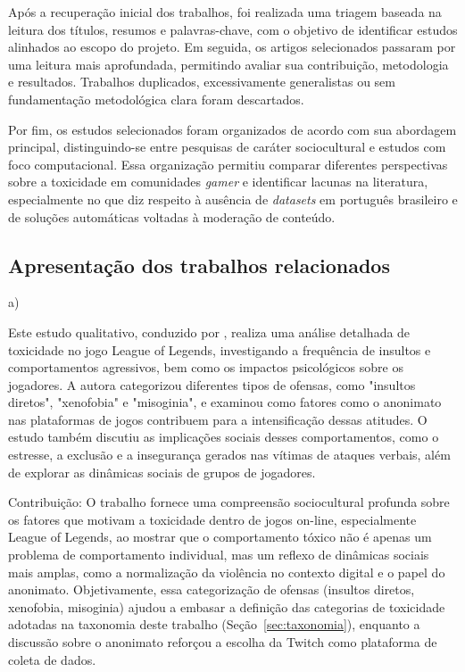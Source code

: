 \documentclass{eic-bcc-tcc}
\begin{document}
Após a recuperação inicial dos trabalhos, foi realizada uma triagem baseada na leitura dos títulos, resumos e palavras-chave, com o objetivo de identificar estudos alinhados ao escopo do projeto. Em seguida, os artigos selecionados passaram por uma leitura mais aprofundada, permitindo avaliar sua contribuição, metodologia e resultados. Trabalhos duplicados, excessivamente generalistas ou sem fundamentação metodológica clara foram descartados.

Por fim, os estudos selecionados foram organizados de acordo com sua abordagem principal, distinguindo-se entre pesquisas de caráter sociocultural e estudos com foco computacional. Essa organização permitiu comparar diferentes perspectivas sobre a toxicidade em comunidades \textit{gamer} e identificar lacunas na literatura, especialmente no que diz respeito à ausência de \textit{datasets} em português brasileiro e de soluções automáticas voltadas à moderação de conteúdo.

\subsection{Apresentação dos trabalhos relacionados}

a) \cite{assali2024comportamento}

Este estudo qualitativo, conduzido por \cite{assali2024comportamento}, realiza uma análise detalhada de toxicidade no jogo League of Legends, investigando a frequência de insultos e comportamentos agressivos, bem como os impactos psicológicos sobre os jogadores. A autora categorizou diferentes tipos de ofensas, como "insultos diretos", "xenofobia" e "misoginia", e examinou como fatores como o anonimato nas plataformas de jogos contribuem para a intensificação dessas atitudes. O estudo também discutiu as implicações sociais desses comportamentos, como o estresse, a exclusão e a insegurança gerados nas vítimas de ataques verbais, além de explorar as dinâmicas sociais de grupos de jogadores.

Contribuição: O trabalho fornece uma compreensão sociocultural profunda sobre os fatores que motivam a toxicidade dentro de jogos on-line, especialmente League of Legends, ao mostrar que o comportamento tóxico não é apenas um problema de comportamento individual, mas um reflexo de dinâmicas sociais mais amplas, como a normalização da violência no contexto digital e o papel do anonimato. Objetivamente, essa categorização de ofensas (insultos diretos, xenofobia, misoginia) ajudou a embasar a definição das categorias de toxicidade adotadas na taxonomia deste trabalho (Seção~\ref{sec:taxonomia}), enquanto a discussão sobre o anonimato reforçou a escolha da Twitch como plataforma de coleta de dados.
\end{document}
